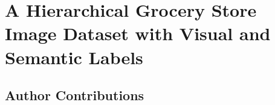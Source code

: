 
\section{A Hierarchical Grocery Store Image Dataset with Visual and Semantic Labels}
\label{sec:paperA}



\subsection{Author Contributions}
